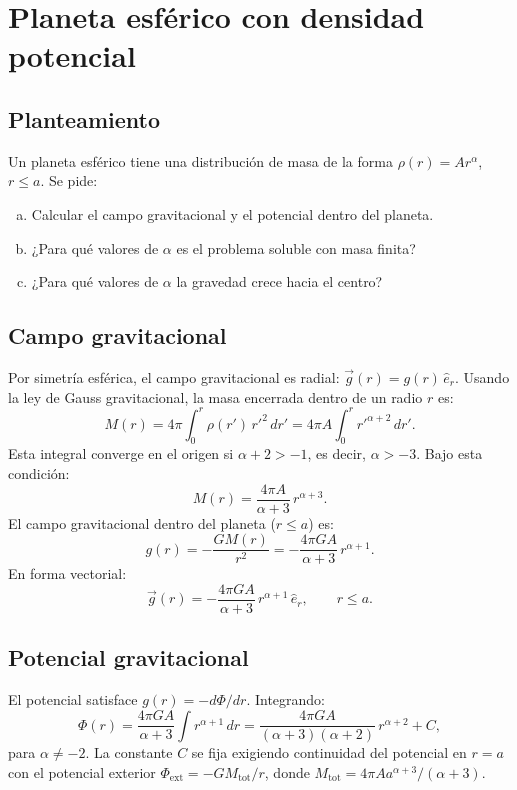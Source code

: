 \section{Planeta esférico con densidad potencial}

\subsection{Planteamiento}

Un planeta esférico tiene una distribución de masa de la forma $\rho(r) = Ar^{\alpha}$, $r \leq a$. Se pide:
\begin{enumerate}[(a)]
    \item Calcular el campo gravitacional y el potencial dentro del planeta.
    \item ¿Para qué valores de $\alpha$ es el problema soluble con masa finita?
    \item ¿Para qué valores de $\alpha$ la gravedad crece hacia el centro?
\end{enumerate}

\subsection{Campo gravitacional}

Por simetría esférica, el campo gravitacional es radial: $\vec{g}(r) = g(r)\,\hat{e}_r$. Usando la ley de Gauss gravitacional, la masa encerrada dentro de un radio $r$ es:
$$
M(r) = 4\pi\int_0^r \rho(r')\,r'^2\,dr' = 4\pi A\int_0^r r'^{\alpha+2}\,dr'.
$$
Esta integral converge en el origen si $\alpha + 2 > -1$, es decir, $\alpha > -3$. Bajo esta condición:
$$
M(r) = \frac{4\pi A}{\alpha + 3}\,r^{\alpha+3}.
$$
El campo gravitacional dentro del planeta ($r \leq a$) es:
$$
g(r) = -\frac{GM(r)}{r^2} = -\frac{4\pi GA}{\alpha + 3}\,r^{\alpha+1}.
$$
En forma vectorial:
$$
\boxed{\vec{g}(r) = -\frac{4\pi GA}{\alpha + 3}\,r^{\alpha+1}\,\hat{e}_r, \qquad r \leq a.}
$$

\subsection{Potencial gravitacional}

El potencial satisface $g(r) = -d\Phi/dr$. Integrando:
$$
\Phi(r) = \frac{4\pi GA}{\alpha + 3}\int r^{\alpha+1}\,dr = \frac{4\pi GA}{(\alpha+3)(\alpha+2)}\,r^{\alpha+2} + C,
$$
para $\alpha \neq -2$. La constante $C$ se fija exigiendo continuidad del potencial en $r = a$ con el potencial exterior $\Phi_{\text{ext}} = -GM_{\text{tot}}/r$, donde $M_{\text{tot}} = 4\pi A a^{\alpha+3}/(\alpha+3)$.

